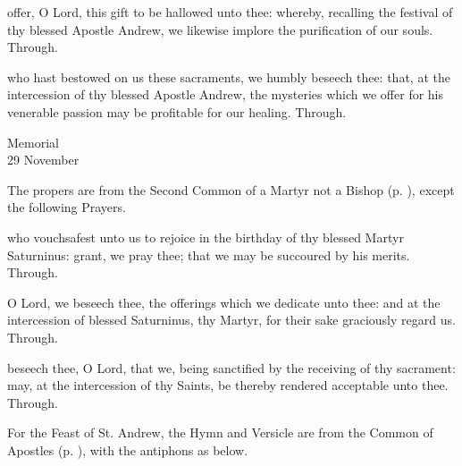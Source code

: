 
\secret
{} offer, O Lord, this gift to be hallowed unto thee: whereby, recalling the festival of thy blessed Apostle Andrew, we likewise implore the purification of our souls. Through.


\postcommunion
{} who hast bestowed on us these sacraments, we humbly beseech thee: that, at the intercession of thy blessed Apostle Andrew, the mysteries which we offer for his venerable passion may be profitable for our healing. Through.

\begin{inhead}
    {Memorial\\
29 November}
\end{inhead}

\begin{rubric}
	The propers are from the Second Common of a Martyr not a Bishop (p. \pageref{CommonMartyrNotBishopII}), except the following Prayers.
\end{rubric}

\collect
{} who vouchsafest unto us to rejoice in the birthday of thy blessed Martyr Saturninus: grant, we pray thee; that we may be succoured by his merits. Through.

\secret
{} O Lord, we beseech thee, the offerings which we dedicate unto thee: and at the intercession of blessed Saturninus, thy Martyr, for their sake graciously regard us. Through.

\postcommunion
{} beseech thee, O Lord, that we, being sanctified by the receiving of thy sacrament: may, at the intercession of thy Saints, be thereby rendered acceptable unto thee. Through.


\begin{rubric}
	For the Feast of St. Andrew, the Hymn and Versicle are from the Common of Apostles (p. \pageref{CommonApostles}), with the antiphons as below.
\end{rubric}



